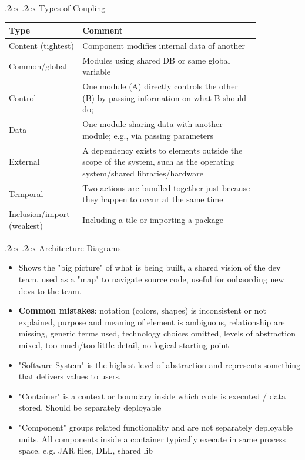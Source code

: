 \documentclass[10pt,landscape,a4paper]{article}
\makeatletter
\renewcommand{\subsection}{\@startsection{subsection}{1}{0mm}%
	{.2ex}%
	{.2ex}%
	{\sffamily\bfseries}}
\makeatother
\begin{document}
\begin{multicols*}{4}
		\subsection{Types of Coupling}
		\begin{tabular}{|p{0.2\linewidth} | p{0.65\linewidth}|}
			\hline
			Type  & Comment \\ \hline
			Content (tightest) & Component modifies internal data of another \\ \hline
			Common/global & Modules using shared DB or same global variable \\ \hline
			Control & One module (A) directly controls the other (B) by passing information
			on what B should do; \\ \hline
			Data & One module sharing data with another module; e.g., via	passing parameters \\ \hline
			External & A dependency exists to elements outside the scope of the	system, such as the operating system/shared libraries/hardware \\ \hline
			Temporal & Two actions are bundled together just because they happen to occur at the same time \\ \hline
			Inclusion/import (weakest) & Including a tile or importing a package \\ \hline
		\end{tabular}
		\subsection{Architecture Diagrams}
		\begin{itemize}
			\item Shows the "big picture" of what is being built, a shared vision of the dev team, used as a "map" to navigate source code, useful for onbaording new devs to the team.
			\item \textbf{Common mistakes}: notation (colors, shapes) is inconsistent or not explained, purpose and meaning of element is ambiguous, relationship are missing, generic terms used, technology choices omitted, levels of abstraction mixed, too much/too little detail, no logical starting point
			\item "Software System" is the highest level of abstraction and represents something that delivers values to users.
			\item "Container" is a context or boundary inside which code is executed / data stored. Should be separately deployable
			\item "Component" groups related functionality and are not separately deployable units. All components inside a container typically execute in same process space. e.g. JAR files, DLL, shared lib
		\end{itemize}

\end{multicols*}
\end{document}
